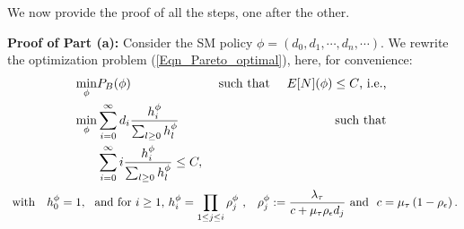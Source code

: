  We now provide the proof of all the steps, one after the other. 

 
\textbf{Proof of Part (a):}
Consider the SM policy $\phi = \left( d_0, d_1, \cdots, d_n, \cdots \right)$.  We rewrite the optimization problem  (\ref{Eqn_Pareto_optimal}), here,  for convenience: 
\begin{eqnarray}
\label{Eqn_optimal_h}
\nonumber
\min_{\phi} &   P_B  (\phi) &\mbox{ such that } \ \ \   E[N] (\phi) \le C \mbox{, i.e., } \\
\min_{\phi  }  & \sum_{i=0}^\infty d_i \frac{h_i^\phi}{ \sum_{l \geq 0} h_l^\phi}  &  \mbox{ such that }  \\
&  \sum_{i=0}^\infty i \frac{h_i^\phi}{ \sum_{l \geq 0} h_l^\phi}   \le C,
\end{eqnarray}
\begin{eqnarray}
 \mbox{ with } \ \  \h_0^{\phi}  = 1, \ \mbox{ and for $i \geq 1$,  }\h_i^{\phi} = \prod_{1 \le j \le i}  \rho_j^{\phi} \ \mbox{,  } \ \ \rho_j^{\phi}  :=  \frac{\lambda_\tau }{ c + \mu_\tau \rho_\epsilon d_j} \ \mbox{and} \ \ c = \mu_\tau \left( 1 - \rho_\epsilon \right).
\nonumber
\end{eqnarray}


